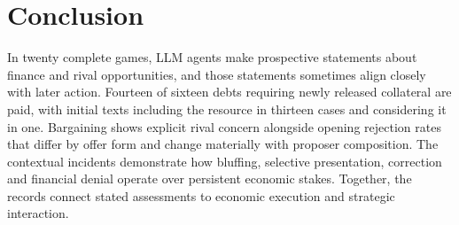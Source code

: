 \section{Conclusion}
In twenty complete games, LLM agents make prospective statements about finance and rival opportunities, and those statements sometimes align closely with later action. Fourteen of sixteen debts requiring newly released collateral are paid, with initial texts including the resource in thirteen cases and considering it in one. Bargaining shows explicit rival concern alongside opening rejection rates that differ by offer form and change materially with proposer composition. The contextual incidents demonstrate how bluffing, selective presentation, correction and financial denial operate over persistent economic stakes. Together, the records connect stated assessments to economic execution and strategic interaction.
